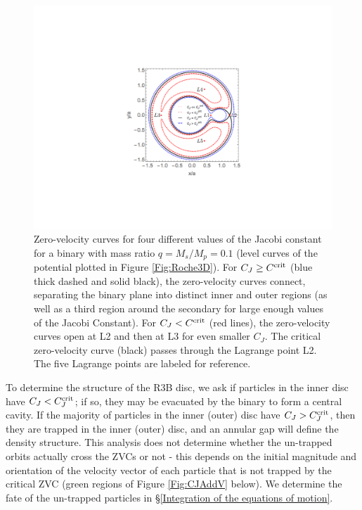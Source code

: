 \begin{figure}
\begin{center}
\includegraphics[scale=0.55]{figures/ch2/Crit_CJ_Curves_q0p1_L3crit.pdf} 
\end{center}
\caption{Zero-velocity curves for four different values of the Jacobi
  constant for a binary with mass ratio $q=M_s/M_p=0.1$ (level curves
  of the potential plotted in Figure \ref{Fig:Roche3D}). For $C_J
  \geq C^{\rm{crit}}$ (blue thick dashed and solid black), the
  zero-velocity curves connect, separating the binary plane into
  distinct inner and outer regions (as well as a third region around
  the secondary for large enough values of the Jacobi Constant). For
  $C_J < C^{\rm{crit}}$ (red lines), the zero-velocity curves open at
  L2 and then at L3 for even smaller $C_J$. The critical zero-velocity
  curve (black) passes through the Lagrange point L2. The five
  Lagrange points are labeled for reference.}
\label{Fig:CJ_Ex}
\end{figure}





To determine the structure of the R3B disc, we ask if particles in the
inner disc have $C_J < C^{\rm{crit}}_J$; if so, they may be evacuated
by the binary to form a central cavity. If the majority of particles
in the inner (outer) disc have $C_J > C^{\rm{crit}}_J$, then they are
trapped in the inner (outer) disc, and an annular gap will define the
density structure. This analysis does not determine whether the un-trapped orbits
actually cross the ZVCs or not - this depends on the initial magnitude
and orientation of the velocity vector of each particle that is not trapped by the 
critical ZVC (green regions of Figure \ref{Fig:CJAddV} below). We determine the 
fate of the un-trapped particles in \S\ref{Integration of the equations of motion}.


